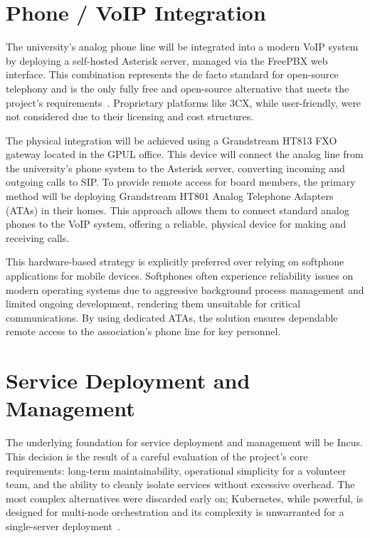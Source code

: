 \section{Phone / VoIP Integration}

The university's analog phone line will be integrated into a modern VoIP system by deploying a self-hosted Asterisk server, managed via the FreePBX web interface. This combination represents the de facto standard for open-source telephony and is the only fully free and open-source alternative that meets the project's requirements~\cite{asterisk-features}. Proprietary platforms like 3CX, while user-friendly, were not considered due to their licensing and cost structures.

The physical integration will be achieved using a Grandstream HT813 FXO gateway located in the GPUL office. This device will connect the analog line from the university's phone system to the Asterisk server, converting incoming and outgoing calls to SIP. To provide remote access for board members, the primary method will be deploying Grandstream HT801 Analog Telephone Adapters (ATAs) in their homes. This approach allows them to connect standard analog phones to the VoIP system, offering a reliable, physical device for making and receiving calls.

This hardware-based strategy is explicitly preferred over relying on softphone applications for mobile devices. Softphones often experience reliability issues on modern operating systems due to aggressive background process management and limited ongoing development, rendering them unsuitable for critical communications. By using dedicated ATAs, the solution ensures dependable remote access to the association's phone line for key personnel.

\section{Service Deployment and Management}

The underlying foundation for service deployment and management will be Incus. This decision is the result of a careful evaluation of the project's core requirements: long-term maintainability, operational simplicity for a volunteer team, and the ability to cleanly isolate services without excessive overhead. The most complex alternatives were discarded early on; Kubernetes, while powerful, is designed for multi-node orchestration and its complexity is unwarranted for a single-server deployment~\cite{kubernetes-docs-2025}.

